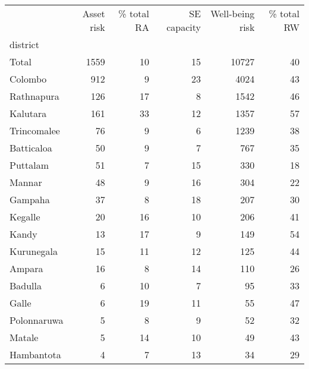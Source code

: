 \begin{tabular}{lrrrrr}
\toprule
{} &  Asset risk &  \% total RA &  SE capacity &  Well-being risk &  \% total RW \\
district     &             &             &              &                  &             \\
\midrule
Total        &        1559 &          10 &           15 &            10727 &          40 \\
Colombo      &         912 &           9 &           23 &             4024 &          43 \\
Rathnapura   &         126 &          17 &            8 &             1542 &          46 \\
Kalutara     &         161 &          33 &           12 &             1357 &          57 \\
Trincomalee  &          76 &           9 &            6 &             1239 &          38 \\
Batticaloa   &          50 &           9 &            7 &              767 &          35 \\
Puttalam     &          51 &           7 &           15 &              330 &          18 \\
Mannar       &          48 &           9 &           16 &              304 &          22 \\
Gampaha      &          37 &           8 &           18 &              207 &          30 \\
Kegalle      &          20 &          16 &           10 &              206 &          41 \\
Kandy        &          13 &          17 &            9 &              149 &          54 \\
Kurunegala   &          15 &          11 &           12 &              125 &          44 \\
Ampara       &          16 &           8 &           14 &              110 &          26 \\
Badulla      &           6 &          10 &            7 &               95 &          33 \\
Galle        &           6 &          19 &           11 &               55 &          47 \\
Polonnaruwa  &           5 &           8 &            9 &               52 &          32 \\
Matale       &           5 &          14 &           10 &               49 &          43 \\
Hambantota   &           4 &           7 &           13 &               34 &          29 \\

\end{tabular}
